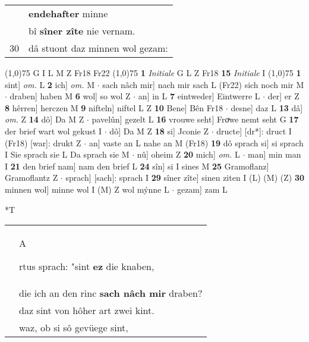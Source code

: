 \documentclass[8pt,a4paper,notitlepage]{article}
\begin{document}
\begin{table}[ht]
\begin{minipage}[t]{0.5\linewidth}
\begin{tabular}{rl}
 & \textbf{endehafter} minne\\ 
 & bî \textbf{sîner zîte} nie vernam.\\ 
30 & dâ stuont daz minnen wol gezam:\\ 
\end{tabular}
\scriptsize
\line(1,0){75} \newline
G I L M Z Fr18 Fr22 \newline
\line(1,0){75} \newline
\textbf{1} \textit{Initiale} G L Z Fr18  \textbf{15} \textit{Initiale} I  \newline
\line(1,0){75} \newline
\textbf{1} sint] \textit{om.} L \textbf{2} ich] \textit{om.} M  $\cdot$ sach nâch mir] nach mir sach L (Fr22) sich noch mir M  $\cdot$ draben] haben M \textbf{6} wol] so wol Z  $\cdot$ an] in L \textbf{7} eintweder] Eintwerre L  $\cdot$ der] er Z \textbf{8} hêrren] herczen M \textbf{9} nifteln] niftel L Z \textbf{10} Bene] Bên Fr18  $\cdot$ desne] daz L \textbf{13} dâ] \textit{om.} Z \textbf{14} dô] Da M Z  $\cdot$ pavelûn] gezelt L \textbf{16} vrouwe seht] Froͮwe nemt seht G \textbf{17} der brief wart wol gekust I  $\cdot$ dô] Da M Z \textbf{18} si] Jconie Z  $\cdot$ dructe] [dr*]: druct I (Fr18) [war]: drukt  Z  $\cdot$ an] vaste an L nahe an M (Fr18) \textbf{19} dô sprach si] si sprach I Sie sprach sie L Da sprach sie M  $\cdot$ nû] oheim Z \textbf{20} mich] \textit{om.} L  $\cdot$ man] min man I \textbf{21} den brief nam] nam den brief L \textbf{24} sîn] si I sines M \textbf{25} Gramoflanz] Gramoflantz Z  $\cdot$ sprach] [sach]: sprach I \textbf{29} sîner zîte] sinen ziten I (L) (M) (Z) \textbf{30} minnen wol] minne wol I (M) Z wol mýnne L  $\cdot$ gezam] zam L \newline
\end{minipage}
\hspace{0.5cm}
\begin{minipage}[t]{0.5\linewidth}
\small
\begin{center}*T
\end{center}
\begin{tabular}{rl}
 & \begin{large}A\end{large}rtus sprach: "sint \textbf{ez} die knaben,\\ 
 & die ich an den rinc \textbf{sach nâch mir} draben?\\ 
 & daz sint von hôher art zwei kint.\\ 
 & waz, ob si sô gevüege sint,\\ 

\end{tabular}
\end{minipage}
\end{table}
\end{document}
